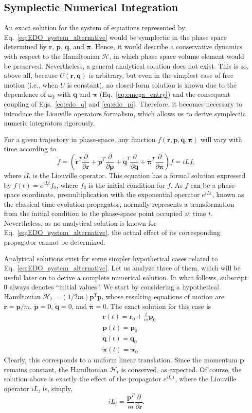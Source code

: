\documentclass[aip,jcp,reprint,amsmath,amssymb]{revtex4-1}
\newcommand{\vt}[1]{\boldsymbol{\mathbf{#1}}}           %
\newcommand{\tr}[1]{#1^T}                               %
\newcommand{\diff}[2]{\dfrac{\partial #1}{\partial #2}} %
\begin{document}
\subsection{Symplectic Numerical Integration}  
\label{symplectic}
An exact solution for the system of equations represented by Eq.~\ref{eq:EDO_system_alternative} would be symplectic in the phase space determined by $\vt r$, $\vt p$, $\vt q$, and $\vt \pi$. Hence, it would describe a conservative dynamics with respect to the Hamiltonian $\mathcal{H}$, in which phase space volume element would be preserved. Nevertheless, a general analytical solution does not exist. This is so, above all, because $U(\vt r, \vt q)$ is arbitrary, but even in the simplest case of free motion (i.e., when $U$ is constant), no closed-form solution is known due to the dependence of $\omega_k$ with $\vt q$ and $\vt \pi$ (Eq.~\ref{eq:omega_entry}) and the consequent coupling of Eqs.~\ref{eq:edo_q} and \ref{eq:edo_pi}. Therefore, it becomes necessary to introduce the Liouville operators formalism, which allows us to derive symplectic numeric integrators rigorously.

For a given trajectory in phase-space, any function $f(\vt r, \vt p, \vt q, \vt \pi)$ will vary with time according to
\[
\dot{f} = \left( \tr{\dot{\vt r}} \diff{}{\vt r} + \tr{\dot{\vt p}} \diff{}{\vt p} + \tr{\dot{\vt q}} \diff{}{\vt q} + \tr{\dot{\vt \pi}} \diff{}{\vt \pi} \right) f = i L f,
\]
where $i L$ is the Liouville operator. This equation has a formal solution expressed by $f(t) = e^{i L t}f_0$, where $f_0$ is the initial condition for $f$. As $f$ can be a phase-space coordinate, premultiplication with the exponential operator $e^{i L t}$, known as the classical time-evolution propagator,\cite{Tuckerman2008} normally represents a transformation from the initial condition to the phase-space point occupied at time $t$. Nevertheless, as no analytical solution is known for Eq.~\ref{eq:EDO_system_alternative}, the actual effect of its corresponding propagator cannot be determined.

Analytical solutions exist for some simpler hypothetical cases related to Eq.~\ref{eq:EDO_system_alternative}. Let us analyze three of them, which will be useful later on to derive a complete numerical solution. In what follows, subscript $0$ always denotes ``initial values''. We start by considering a hypothetical Hamiltonian $\mathcal{H}_t = (1/2m) \tr{\vt p} \vt p$, whose resulting equations of motion are $\dot{\vt r} = {\vt p}/m$, $\dot{\vt p} = 0$, $\dot{\vt q} = 0$, and $\dot{\vt \pi} = 0$. The exact solution for this case is
\begin{align*}
&{\vt r}(t) = {\vt r}_0 + \frac{t}{m} {\vt p}_0 \\
&{\vt p}(t) = {\vt p}_0 \\
&{\vt q}(t) = {\vt q}_0 \\
&{\vt \pi}(t) = {\vt \pi}_0
\end{align*}
Clearly, this corresponds to a uniform linear translation. Since the momentum $\vt p$ remains constant, the Hamiltonian $\mathcal{H}_t$ is conserved, as expected. Of course, the solution above is exactly the effect of the propagator $e^{i L_t t}$, where the Liouville operator $i L_t$ is, simply,
\[
i L_t = \frac{\tr{\vt p}}{m}\diff{}{\vt r}.
\]
\end{document}
